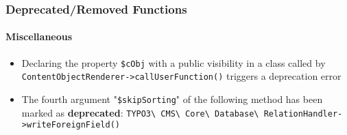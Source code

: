 %

\begin{frame}[fragile]
	\frametitle{Deprecated/Removed Functions}
	\framesubtitle{Miscellaneous}


	\begin{itemize}
		\item Declaring the property \texttt{\$cObj} with a public visibility in
			a class called by \texttt{ContentObjectRenderer->callUserFunction()}
			triggers a deprecation error
		\item The fourth argument "\texttt{\$skipSorting}" of the following
			method has been marked as \textbf{deprecated}:
			\small\texttt{TYPO3\textbackslash
				CMS\textbackslash
				Core\textbackslash
				Database\textbackslash
				RelationHandler->writeForeignField()}\normalsize
	\end{itemize}

\end{frame}

